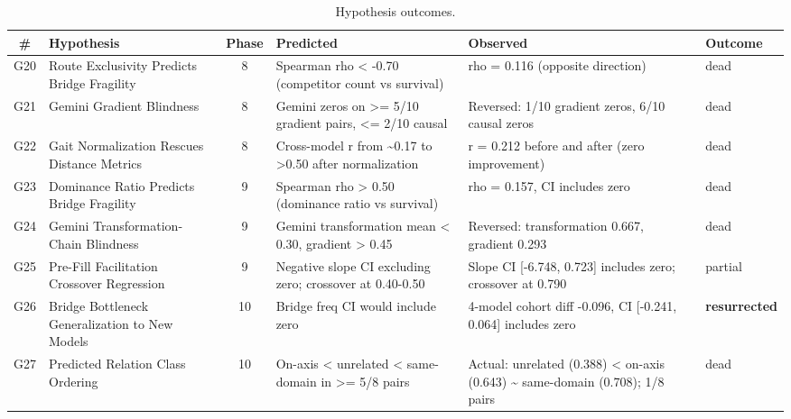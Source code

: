 \begin{table}[t]
\centering
\caption{Hypothesis outcomes.}
\label{tab:hypotheses}
\small
\begin{tabular}{cl c p{3.5cm} p{3.8cm} l}
\toprule
\# & Hypothesis & Phase & Predicted & Observed & Outcome \\
\midrule
    G20 & Route Exclusivity Predicts Bridge Fragility & 8 & Spearman rho < -0.70 (competitor count vs survival) & rho = 0.116 (opposite direction) & dead \\
    G21 & Gemini Gradient Blindness & 8 & Gemini zeros on >= 5/10 gradient pairs, <= 2/10 causal & Reversed: 1/10 gradient zeros, 6/10 causal zeros & dead \\
    G22 & Gait Normalization Rescues Distance Metrics & 8 & Cross-model r from \textasciitilde{}0.17 to >0.50 after normalization & r = 0.212 before and after (zero improvement) & dead \\
    G23 & Dominance Ratio Predicts Bridge Fragility & 9 & Spearman rho > 0.50 (dominance ratio vs survival) & rho = 0.157, CI includes zero & dead \\
    G24 & Gemini Transformation-Chain Blindness & 9 & Gemini transformation mean < 0.30, gradient > 0.45 & Reversed: transformation 0.667, gradient 0.293 & dead \\
    G25 & Pre-Fill Facilitation Crossover Regression & 9 & Negative slope CI excluding zero; crossover at 0.40-0.50 & Slope CI [-6.748, 0.723] includes zero; crossover at 0.790 & partial \\
    G26 & Bridge Bottleneck Generalization to New Models & 10 & Bridge freq CI would include zero & 4-model cohort diff -0.096, CI [-0.241, 0.064] includes zero & \textbf{resurrected} \\
    G27 & Predicted Relation Class Ordering & 10 & On-axis < unrelated < same-domain in >= 5/8 pairs & Actual: unrelated (0.388) < on-axis (0.643) \textasciitilde{} same-domain (0.708); 1/8 pairs & dead \\
\bottomrule
\end{tabular}
\end{table}
